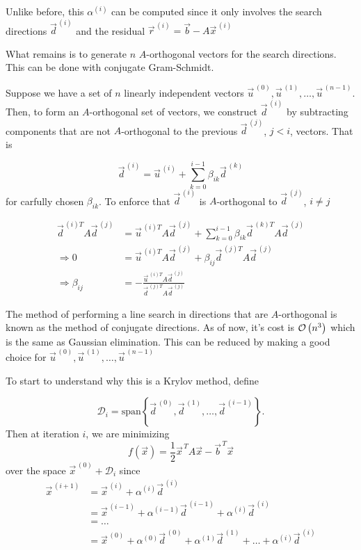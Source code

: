 Unlike before, this $\alpha^{(i)}$ can be computed since it only involves the search directions $\vec{d}^{\,(i)}$ and the residual $\vec{r}^{\,(i)} = \vec{b} - A\vec{x}^{\,(i)}$


What remains is to generate $n$ $A$-orthogonal vectors for the search directions. This can be done with conjugate Gram-Schmidt.

Suppose we have a set of $n$ linearly independent vectors
$ \vec{u}^{\,(0)}, \vec{u}^{\,(1)}, \ldots, \vec{u}^{\,(n-1)} $. Then, to form an $A$-orthogonal set of vectors, we construct $\vec{d}^{\,(i)}$ by subtracting components that are not $A$-orthogonal to the previous $\vec{d}^{\,(j)}$, $j<i$, vectors. That is

\begin{equation*}
    \vec{d}^{\,(i)} = \vec{u}^{\,(i)}
    + \sum_{k=0}^{i-1}\beta_{ik}\vec{d}^{\,(k)}
\end{equation*}
for carfully chosen $\beta_{ik}$. To enforce that $\vec{d}^{\,(i)}$ is $A$-orthogonal to $\vec{d}^{\,(j)}$, $i\neq j$

\begin{align*}
    \vec{d}^{\,(i)T}A\vec{d}^{\,(j)}  &= \vec{u}^{\,(i)T}A\vec{d}^{\,(j)}
    + \sum_{k=0}^{i-1}\beta_{ik}\vec{d}^{\,(k)T}A\vec{d}^{\,(j)} \\
    \Rightarrow 0 &=  \vec{u}^{\,(i)T}A\vec{d}^{\,(j)}
    + \beta_{ij}\vec{d}^{\,(j)T}A\vec{d}^{\,(j)} \\
    \Rightarrow \beta_{ij} &= -\frac{\vec{u}^{\,(i)T}A\vec{d}^{\,(j)}}{\vec{d}^{\,(j)T}A\vec{d}^{\,(j)}}
\end{align*}


The method of performing a line search in directions that are $A$-orthogonal is known as
the method of conjugate directions. As of now, it's cost is $\mathcal{O}\left(n^3\right)$ which is the same as Gaussian elimination. This can be reduced by making a good choice for $\vec{u}^{\,(0)}, \vec{u}^{\,(1)}, \ldots, \vec{u}^{\,(n-1)}$


To start to understand why this is a Krylov method, define

\begin{equation*}
    \mathcal{D}_i = \text{span}\left\{ \vec{d}^{\,(0)}, \vec{d}^{\,(1)}, \ldots, \vec{d}^{\,(i-1)}\right\}.
\end{equation*}
Then at iteration $i$, we are minimizing
\begin{equation*}
    f(\vec{x}) = \frac{1}{2}\vec{x}^{\,T}A\vec{x} - \vec{b}^{\,T}\vec{x}
\end{equation*}
over the space $\vec{x}^{\,(0)} + \mathcal{D}_i$ since
\begin{align*}
    \vec{x}^{\,(i+1)} &= \vec{x}^{\,(i)} + \alpha^{(i)}\vec{d}^{\,(i)} \\
    &= \vec{x}^{\,(i-1)} + \alpha^{(i-1)}\vec{d}^{\,(i-1)} + \alpha^{(i)}\vec{d}^{\,(i)} \\
    &= \ldots \\
    &= \vec{x}^{\,(0)} + \alpha^{(0)}\vec{d}^{\,(0)} + \alpha^{(1)}\vec{d}^{\,(1)} + \ldots + \alpha^{(i)}\vec{d}^{\,(i)}
\end{align*}

